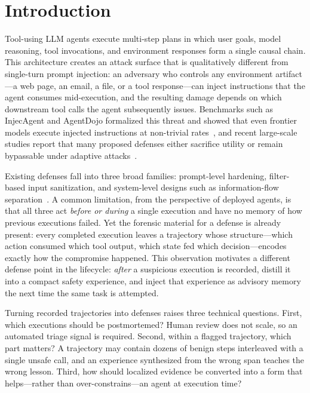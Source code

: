 \section{Introduction}
\label{sec:introduction}

Tool-using LLM agents execute multi-step plans in which user goals, model reasoning, tool invocations, and environment responses form a single causal chain. This architecture creates an attack surface that is qualitatively different from single-turn prompt injection: an adversary who controls any environment artifact---a web page, an email, a file, or a tool response---can inject instructions that the agent consumes mid-execution, and the resulting damage depends on which downstream tool calls the agent subsequently issues. Benchmarks such as InjecAgent and AgentDojo formalized this threat and showed that even frontier models execute injected instructions at non-trivial rates~\cite{zhan2024injecagent,debenedetti2024agentdojo}, and recent large-scale studies report that many proposed defenses either sacrifice utility or remain bypassable under adaptive attacks~\cite{ma2026autodojo,bhagwatkar2025indirect}.

Existing defenses fall into three broad families: prompt-level hardening, filter-based input sanitization, and system-level designs such as information-flow separation~\cite{chen2024struq,chen2024secalign,debenedetti2024agentdojo}. A common limitation, from the perspective of deployed agents, is that all three act \emph{before or during} a single execution and have no memory of how previous executions failed. Yet the forensic material for a defense is already present: every completed execution leaves a trajectory whose structure---which action consumed which tool output, which state fed which decision---encodes exactly how the compromise happened. This observation motivates a different defense point in the lifecycle: \emph{after} a suspicious execution is recorded, distill it into a compact safety experience, and inject that experience as advisory memory the next time the same task is attempted.

Turning recorded trajectories into defenses raises three technical questions. First, which executions should be postmortemed? Human review does not scale, so an automated triage signal is required. Second, within a flagged trajectory, which part matters? A trajectory may contain dozens of benign steps interleaved with a single unsafe call, and an experience synthesized from the wrong span teaches the wrong lesson. Third, how should localized evidence be converted into a form that helps---rather than over-constrains---an agent at execution time?

